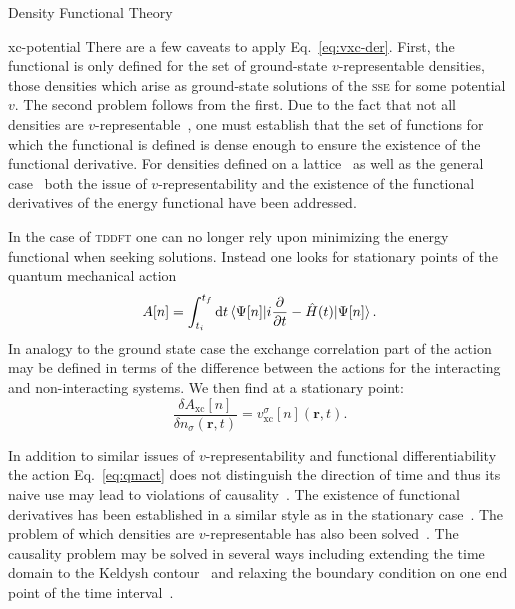 \documentclass[letterpaper, 11 pt]{report}
\begin{document}
\begin{chapter}{Density Functional Theory \label{chap:dft}}
\begin{section}{xc-potential \label{sec:xcpot}}
      There are a few caveats to apply Eq.~\eqref{eq:vxc-der}. First, the functional is only defined
      for the set of ground-state $v$-representable densities, those densities which arise as
      ground-state solutions of the \textsc{sse} for some potential $v$. The second problem follows
      from the first. Due to the fact that not all densities are $v$-representable~\cite{not-vrep1,
      not-vrep2, not-vrep3}, one must establish that the set of functions for which the functional is
      defined is dense enough to ensure the existence of the functional derivative. For densities
      defined on a lattice~\cite{vrep-lat} as well as the general case~\cite{nonint1, nonint2,
      vrep-levy1, not-vrep1, vrep-lieb, vrep-rev} both the issue of $v$-representability and the
      existence of the functional derivatives of the energy functional have been addressed.

      In the case of \textsc{tddft} one can no longer rely upon minimizing the energy functional when
      seeking solutions. Instead one looks for stationary points of the quantum mechanical
      action~\cite{qmaction}
      \begin{equation} \label{eq:qmact}
         A[n] = \int^{t_f}_{t_i} \mathrm{d}t
            \braket{\Psi[n] |i\frac{\partial}{\partial t} -\hat{H}(t) | \Psi[n]}.
      \end{equation}
      In analogy to the ground state case the exchange correlation part of the action may be defined in
      terms of the difference between the actions for the interacting and non-interacting systems. We
      then find at a stationary point:
      \begin{equation} \label{eq:tdvxc-der}
         \frac{\delta A_\mathrm{xc}[n]}{\delta n_\sigma(\mathbf{r},t)}
            = v^\sigma_\mathrm{xc}[n](\mathbf{r},t).
      \end{equation}

      In addition to similar issues of $v$-representability and functional differentiability the action
      Eq.~\eqref{eq:qmact} does not distinguish the direction of time and thus its naive use may lead
      to violations of causality~\cite{tddft-causality}. The existence of functional derivatives has
      been established in a similar style as in the stationary case~\cite{td-welldef}. The problem of
      which densities are $v$-representable has also been solved~\cite{td-vrep}. The causality problem
      may be solved in several ways including extending the time domain to the Keldysh
      contour~\cite{caus-sol1} and relaxing the boundary condition on one end point of the time
      interval~\cite{caus-sol2}.


\end{section}
\end{chapter}
\end{document}
